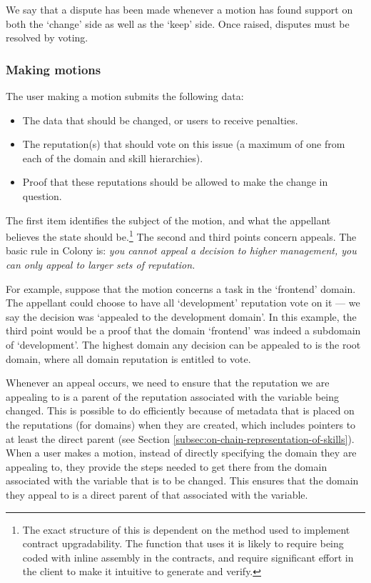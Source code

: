 We say that a dispute has been made whenever a motion has found support on both the `change' side as well as the `keep' side. Once raised, disputes must be resolved by voting.

\subsubsection{Making motions}

The user making a motion submits the following data:

\begin{itemize}
 \item The data that should be changed, or users to receive penalties.
 \item The reputation(s) that should vote on this issue (a maximum of one from each of the domain and skill hierarchies).
 \item Proof that these reputations should be allowed to make the change in question.
\end{itemize}

The first item identifies the subject of the motion, and what the appellant believes the state should be.\footnote{The exact structure of this is dependent on the method used to implement contract upgradability. The function that uses it is likely to require being coded with inline assembly in the contracts, and require significant effort in the client to make it intuitive to generate and verify.} The second and third points concern appeals. The basic rule in Colony is: \textit{you cannot appeal a decision to higher management, you can only appeal to larger sets of reputation.}

For example, suppose that the motion concerns a task in the `frontend' domain. The appellant could choose to have all `development' reputation vote on it --- we say the decision was `appealed to the development domain'. In this example, the third point would be a proof that the domain `frontend' was indeed a subdomain of `development'. The highest domain any decision can be appealed to is the root domain, where all domain reputation is entitled to vote.

Whenever an appeal occurs, we need to ensure that the reputation we are appealing to is a parent of the reputation associated with the variable being changed. This is possible to do efficiently because of metadata that is placed on the reputations (for domains) when they are created, which includes pointers to at least the direct parent (see Section \ref{subsec:on-chain-representation-of-skills}). When a user makes a motion, instead of directly specifying the domain they are appealing to, they provide the steps needed to get there from the domain associated with the variable that is to be changed. This ensures that the domain they appeal to is a direct parent of that associated with the variable.

